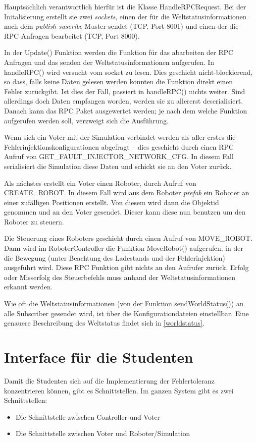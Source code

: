 Haupts{\"{a}}chlich verantwortlich hierf{\"{u}}r ist die Klasse HandleRPCRequest. Bei der Initalisierung erstellt sie zwei \textit{sockets}, einen der f{\"{u}}r
die Weltstatusinformationen nach dem \textit{publish-suscribe} Muster sendet (TCP, Port 8001) und einen der die RPC Anfragen bearbeitet (TCP, Port 8000).

In der Update() Funktion werden die Funktion f{\"{u}}r das abarbeiten der RPC Anfragen und das senden der Weltstatusinformationen aufgerufen. In handleRPC()
wird versucht vom socket zu lesen. Dies geschieht nicht-blockierend, so dass, falls keine Daten gelesen werden konnten die Funktion direkt einen Fehler
zur{\"{u}}ckgibt. Ist dies der Fall, passiert in handleRPC() nichts weiter. Sind allerdings doch Daten empfangen worden, werden sie zu allererst deserialisiert.
Danach kann das RPC Paket ausgewertet werden; je nach dem welche Funktion aufgerufen werden soll, verzweigt sich die Ausf{\"{u}}hrung.

Wenn sich ein Voter mit der Simulation verbindet werden als aller erstes die Fehlerinjektionskonfigurationen abgefragt -- dies geschieht durch einen RPC Aufruf
von GET\_FAULT\_INJECTOR\_NETWORK\_CFG. In diesem Fall serialisiert die Simulation diese Daten und schickt sie an den Voter zur{\"{u}}ck.

Als n{\"{a}}chstes erstellt ein Voter einen Roboter, durch Aufruf von CREATE\_ROBOT. In diesem Fall wird aus dem Roboter \textit{prefab} ein Roboter an einer
zuf{\"{a}}lligen Positionen erstellt. Von diesem wird dann die Objektid genommen und an den Voter gesendet. Dieser kann diese nun benutzen um den Roboter zu
steuern.

Die Steuerung eines Roboters geschieht durch einen Aufruf von MOVE\_ROBOT. Dann wird im RoboterController die Funktion MoveRobot() aufgerufen, in der die
Bewegung (unter Beachtung des Ladestands und der Fehlerinjektion) ausgef{\"{u}}hrt wird. Diese RPC Funktion gibt nichts an den Aufrufer zur{\"{u}}ck, Erfolg
oder Misserfolg des Steuerbefehls muss anhand der Weltstatusinformationen erkannt werden.

Wie oft die Weltstatusinformationen (von der Funktion sendWorldStatus()) an alle Subscriber gesendet wird, ist {\"{u}}ber die Konfigurationdateien
einstellbar. Eine genauere Beschreibung des Weltstatus findet sich in \ref{worldstatus}.

\clearpage
\section{Interface f{\"{u}}r die Studenten}\label{interface}
Damit die Studenten sich auf die Implementierung der Fehlertoleranz konzentrieren k{\"{o}}nnen, gibt es Schnittstellen.
Im ganzen System gibt es zwei Schnittstellen:
\begin{itemize}
\item Die Schnittstelle zwischen Controller und Voter
\item Die Schnittstelle zwischen Voter und Roboter/Simulation
\end{itemize}


